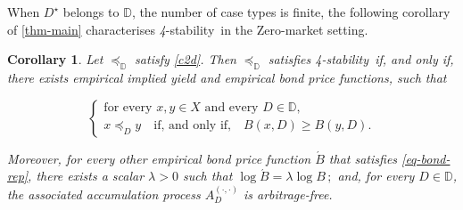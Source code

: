 \documentclass[ecta,nameyear,draft]{econsocart}
\newcommand{\mbbd}{{\mathds D}}
\newcommand{\dd}{{(\cdot,\cdot)}}
\newcommand{\stability}{\textit{4}-\textup{{stability}}}
\theoremstyle{plain}
\newtheorem{corollary}{Corollary}[theorem]
\theoremstyle{remark}
\begin{document}
When $D^{\star}$ belongs to $\mbbd$, the number of case types is finite, the
following corollary of \cref{thm-main} characterises \stability\ in the
Zero-market setting.
\begin{corollary}\label{cor-bond-rep} Let $\preceq_{\mbbd}$ satisfy \ref{c2d}.
  Then $\preceq_{\mbbd}$ satisfies \stability\ if, and only if, there exists
  empirical implied yield and empirical bond price functions, such that
  \begin{linenomath*} 
    \begin{equation}\tag{$*$}\label{eq-bond-rep} \left\{
        \begin{array}{l}
          \text{for every $x , y \in X$ and every $D \in \mbbd$,}\\
          x \preceq_{D} y \quad \text{if, and only if,}\quad B(x,D) \geq B(y,D).
      \end{array}\right.
    \end{equation}
  \end{linenomath*} 
  Moreover, for every other empirical bond price function $\acute{B}$ that
  satisfies \eqref{eq-bond-rep}, there exists a scalar $\lambda > 0$ such that
  $\log \acute{B} = \lambda \log B\,;$ and, for every $D\in \mbbd$, the
  associated accumulation process ${A}^{\dd}_{D}$ is arbitrage-free.

\end{corollary}
\end{document}
